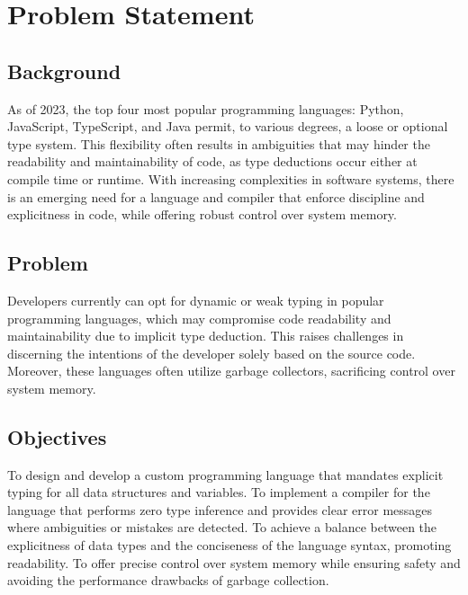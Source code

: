 \section{Problem Statement}
\label{sec:ProblemStatement}

\subsection{Background}

As of 2023, the top four most popular programming languages: Python, JavaScript,
TypeScript, and Java permit, to various degrees, a loose or optional type
system\cite{STACK}. This flexibility often results in ambiguities that may hinder the
readability and maintainability of code, as type deductions occur either at compile
time or runtime. With increasing complexities in software systems, there is an
emerging need for a language and compiler that enforce discipline and explicitness in
code, while offering robust control over system memory.

\subsection{Problem}

Developers currently can opt for dynamic or weak typing in popular programming
languages, which may compromise code readability and maintainability due to implicit
type deduction. This raises challenges in discerning the intentions of the developer
solely based on the source code. Moreover, these languages often utilize garbage
collectors, sacrificing control over system memory.

\subsection{Objectives}

To design and develop a custom programming language that mandates explicit typing for
all data structures and variables. To implement a compiler for the language that
performs zero type inference and provides clear error messages where ambiguities or
mistakes are detected. To achieve a balance between the explicitness of data types
and the conciseness of the language syntax, promoting readability. To offer precise
control over system memory while ensuring safety and avoiding the performance
drawbacks of garbage collection.
